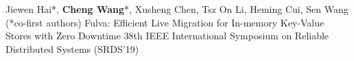 \cvpub
{Jiewen Hai*, \textbf{Cheng Wang}*, Xusheng Chen, Tsz On Li, Heming Cui, Sen Wang (*co-first authors)} %
{Fulva: Efficient Live Migration for In-memory Key-Value Stores with Zero Downtime} %
{} %
{} %
{ %
38th IEEE International Symposium on Reliable Distributed Systems (SRDS'19) 
}
